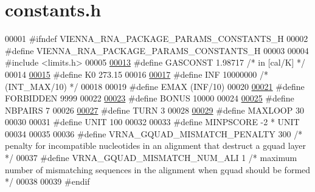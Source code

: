 \hypertarget{constants_8h_source}{}\section{constants.\+h}
\label{constants_8h_source}

\begin{DoxyCode}
00001 \textcolor{preprocessor}{#ifndef VIENNA\_RNA\_PACKAGE\_PARAMS\_CONSTANTS\_H}
00002 \textcolor{preprocessor}{#define VIENNA\_RNA\_PACKAGE\_PARAMS\_CONSTANTS\_H}
00003 
00004 \textcolor{preprocessor}{#include <limits.h>}
00005 
\hyperlink{constants_8h_ab1e4a8d82f24ed5db01dde5f25269cf1}{00013} \textcolor{preprocessor}{#define GASCONST 1.98717  }\textcolor{comment}{/* in [cal/K] */}\textcolor{preprocessor}{}
00014 
\hyperlink{constants_8h_a307c72605e3713972b4f4fb2d53ea20e}{00015} \textcolor{preprocessor}{#define K0  273.15}
00016 
\hyperlink{constants_8h_a12c2040f25d8e3a7b9e1c2024c618cb6}{00017} \textcolor{preprocessor}{#define INF 10000000 }\textcolor{comment}{/* (INT\_MAX/10) */}\textcolor{preprocessor}{}
00018 
00019 \textcolor{preprocessor}{#define EMAX (INF/10)}
00020 
\hyperlink{constants_8h_a5064c29ab2d1e20c2304b3c67562774d}{00021} \textcolor{preprocessor}{#define FORBIDDEN 9999}
00022 
\hyperlink{constants_8h_a96a9822fa134450197dd454b1478a193}{00023} \textcolor{preprocessor}{#define BONUS 10000}
00024 
\hyperlink{constants_8h_a5e75221c779d618eab81e096f37e32ce}{00025} \textcolor{preprocessor}{#define NBPAIRS 7}
00026 
\hyperlink{constants_8h_ae646250fd59311356c7e5722a81c3a96}{00027} \textcolor{preprocessor}{#define TURN 3}
00028 
\hyperlink{constants_8h_ad1bd6eabac419670ddd3c9ed82145988}{00029} \textcolor{preprocessor}{#define MAXLOOP 30}
00030 
00031 \textcolor{preprocessor}{#define UNIT 100}
00032 
00033 \textcolor{preprocessor}{#define MINPSCORE -2 * UNIT}
00034 
00035 
00036 \textcolor{preprocessor}{#define   VRNA\_GQUAD\_MISMATCH\_PENALTY   300   }\textcolor{comment}{/* penalty for incompatible nucleotides in an alignment that
       destruct a gquad layer */}\textcolor{preprocessor}{}
00037 \textcolor{preprocessor}{#define   VRNA\_GQUAD\_MISMATCH\_NUM\_ALI   1   }\textcolor{comment}{/* maximum number of mismatching sequences in the alignment
       when gquad should be formed */}\textcolor{preprocessor}{}
00038 
00039 \textcolor{preprocessor}{#endif}
\end{DoxyCode}
